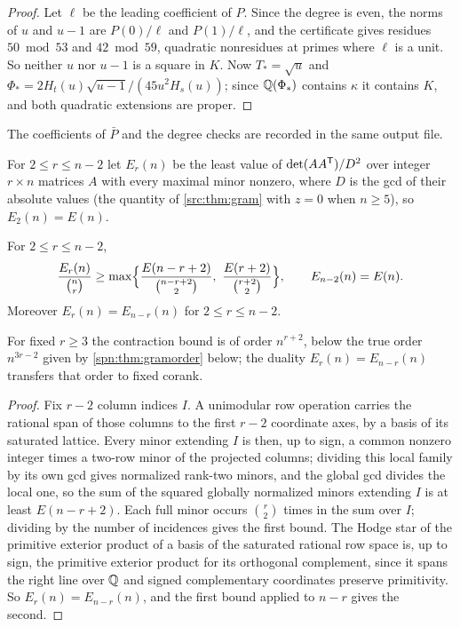 \begin{proof}
Let $\ell$ be the leading coefficient of $P$. Since the degree is even, the norms of $u$ and $u-1$ are
$P(0)/\ell$ and $P(1)/\ell$, and the certificate gives residues $50\bmod53$ and $42\bmod59$, quadratic
nonresidues at primes where $\ell$ is a unit. So neither $u$ nor $u-1$ is a square in $K$. Now $T_*=\sqrt u$
and $\Phi_*=2H_t(u)\sqrt{u-1}/(45u^2H_s(u))$; since $\mathbb{Q}(\Phi_*)$ contains $\kappa$ it contains $K$, and both
quadratic extensions are proper.
\end{proof}

The coefficients of $\bar P$ and the degree checks are recorded in the same output file.

For $2\le r\le n-2$ let $E_r(n)$ be the least value of $\det(AA^{\mathsf{T}})/D^2$ over integer $r\times n$
matrices $A$ with every maximal minor nonzero, where $D$ is the gcd of their absolute values (the
quantity of \cref{src:thm:gram} with $z=0$ when $n\ge5$), so $E_2(n)=E(n)$.

\begin{corollary}\label{src:cor:gramrank}
For $2\le r\le n-2$,
\[
 \frac{E_r(n)}{\binom nr}\ge\max\Bigl\{\frac{E(n-r+2)}{\binom{n-r+2}2},\ \frac{E(r+2)}{\binom{r+2}2}\Bigr\},
 \qquad E_{n-2}(n)=E(n).
\]
Moreover $E_r(n)=E_{n-r}(n)$ for $2\le r\le n-2$.
\end{corollary}

For fixed $r\ge3$ the contraction bound is of order $n^{r+2}$, below the true order $n^{3r-2}$ given by
\cref{spn:thm:gramorder} below; the duality $E_r(n)=E_{n-r}(n)$ transfers that order to fixed corank.

\begin{proof}
Fix $r-2$ column indices $I$. A unimodular row operation carries the rational span of those columns to the
first $r-2$ coordinate axes, by a basis of its saturated lattice. Every minor extending $I$ is then, up to
sign, a common nonzero integer times a two-row minor of the projected columns; dividing this local family by
its own gcd gives normalized rank-two minors, and the global gcd divides the local one, so the sum of the
squared globally normalized minors extending $I$ is at least $E(n-r+2)$. Each full minor occurs $\binom r2$
times in the sum over $I$; dividing by the number of incidences gives the first bound. The Hodge star of the
primitive exterior product of a basis of the saturated rational row space is, up to sign, the primitive
exterior product for its orthogonal complement, since it spans the right line over $\mathbb{Q}$ and signed
complementary coordinates preserve primitivity. So $E_r(n)=E_{n-r}(n)$, and the first bound applied to
$n-r$ gives the second.
\end{proof}

